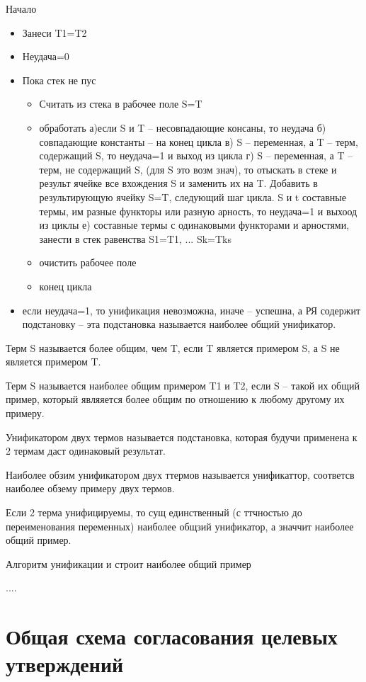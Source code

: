 \documentclass[12pt]{report}
\begin{document}
Начало
\begin{itemize}
	\item Занеси T1=T2
	\item Неудача=0
	\item Пока стек не пус
	\begin{itemize}
		\item Считать из стека в рабочее поле S=T
		\item обработать а)если  S и T -- несовпадающие консаны, то неудача
		б) совпадающие константы -- на конец цикла
		в) S -- переменная, а T -- терм, содержащий S, то неудача=1 и выход из цикла
		г) S -- переменная, а T -- терм, не содержащий S, (для S это возм знач), то отыскать в стеке и результ ячейке все  вхождения S и заменить их на T. Добавить в результирующую ячейку S=T, следующий шаг цикла.
		S и t составные термы,  им разные функторы или разную арность, то неудача=1 и выхоод из циклы
		е) составные термы с одинаковыми функторами и арностями, занести в стек равенства S1=T1, ... Sk=Tks
		\item очистить рабочее поле
		\item конец цикла
	\end{itemize}
\item если неудача=1, то унификация невозможна, иначе -- успешна,  а РЯ содержит подстановку -- эта подстановка называется наиболее общий унификатор. 
\end{itemize}

Терм S называется более общим, чем T, если  T является примером S, а S не является примером T.

Терм S называется наиболее общим примером T1 и T2, если S -- такой их общий пример, который являяется более общим по отношению к любому другому их примеру.

Унификатором двух термов называется подстановка, которая будучи применена к 2 термам даст одинаковый результат.

Наиболее обзим унификатором двух ттермов называется унификаттор, соответсв наиболее обзему примеру двух термов.

Если  2 терма унифицируемы, то сущ единственный (с ттчностью до переименования переменных) наиболее общзий унификатор, а значчит наиболее общий пример.

Алгоритм унификации и строит наиболее общий пример

....



\section{Общая схема согласования целевых утверждений}
\end{document}
